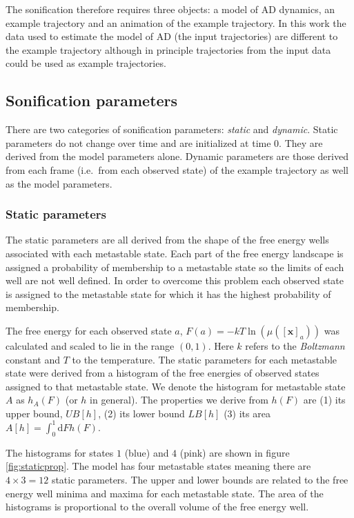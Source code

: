 \documentclass[a4paper,10pt,oneside]{article}
\begin{document}
\begin{sloppy}
The sonification therefore requires three objects: a model of AD dynamics, an example trajectory and an animation of the example trajectory. In this work the data used to estimate the model of AD (the input trajectories) are different to the example trajectory although in principle trajectories from the input data could be used as example trajectories. 

\subsection{Sonification parameters}
There are two categories of sonification parameters: \emph{static} and \emph{dynamic}. Static parameters do not change over time and are initialized at time $0$. They are derived from the model parameters alone. Dynamic parameters are those derived from each frame (i.e.\ from each observed state) of the example trajectory as well as the model parameters.
\subsubsection{Static parameters}\label{ssec:static}
The static parameters are all derived from the shape of the free energy wells associated with each metastable state. Each part of the free energy landscape is assigned a probability of membership to a metastable state so the limits of each well are not well defined. In order to overcome this problem each observed state is assigned to the metastable state for which it has the highest probability of membership.  

The free energy for each observed state $a$, $F(a) = -kT\ln(\mu([\mathbf{x}]_{a}))$ was calculated and scaled to lie in the range $(0,1)$. Here $k$ refers to the \emph{Boltzmann} constant and $T$ to the temperature. The static parameters for each metastable state were derived from a histogram of the free energies of observed states assigned to that metastable state.  We denote the histogram for metastable state $A$ as $h_{A}(F)$ (or $h$ in general). The properties we derive from $h(F)$ are (1) its upper bound, $UB[h]$, (2) its lower bound $LB[h]$ (3) its area $A[h] = \int^{1}_{0}\mathrm{d}F h(F)$. 

The histograms for states $1$ (blue) and $4$ (pink) are shown in figure \ref{fig:staticprop}. The model has four metastable states meaning there are $4\times 3 = 12$ static parameters. The upper and lower bounds are related to the free energy well minima and maxima for each metastable state.  The area of the histograms is proportional to the overall volume of the free energy well.


\end{sloppy}
\end{document}
